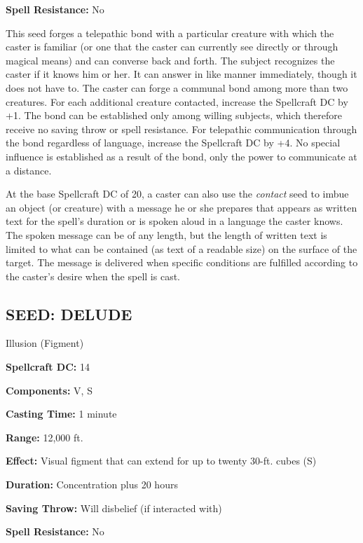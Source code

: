 \documentclass{article}
\begin{document}
\textbf{Spell Resistance:} No 

This seed forges a telepathic bond with a particular creature with which the caster 
is familiar (or one that the caster can currently see directly or through magical 
means) and can converse back and forth. The subject recognizes the caster if it 
knows him or her. It can answer in like manner immediately, though it does not 
have to. The caster can forge a communal bond among more than two creatures. For 
each additional creature contacted, increase the Spellcraft DC by +1. The bond 
can be established only among willing subjects, which therefore receive no saving 
throw or spell resistance. For telepathic communication through the bond regardless 
of language, increase the Spellcraft DC by +4. No special influence is established 
as a result of the bond, only the power to communicate at a distance. 

At the base Spellcraft DC of 20, a caster can also use the \textit{contact }seed 
to imbue an object (or creature) with a message he or she prepares that appears 
as written text for the spell's duration or is spoken aloud in a language the caster 
knows. The spoken message can be of any length, but the length of written text 
is limited to what can be contained (as text of a readable size) on the surface 
of the target. The message is delivered when specific conditions are fulfilled 
according to the caster's desire when the spell is cast.

\vspace{12pt}
\subsection*{SEED: DELUDE }

Illusion (Figment) 

\textbf{Spellcraft DC:} 14 

\textbf{Components:} V, S 

\textbf{Casting Time:} 1 minute 

\textbf{Range:} 12,000 ft. 

\textbf{Effect:} Visual figment that can extend for up to twenty 30-ft. cubes (S) 

\textbf{Duration:} Concentration plus 20 hours 

\textbf{Saving Throw:} Will disbelief (if interacted with) 

\textbf{Spell Resistance:} No 
\end{document}
